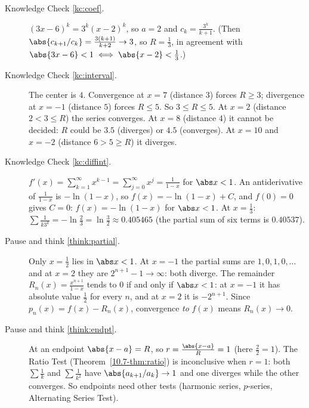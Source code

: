 \documentclass[11pt]{article}
\begin{document}
\begin{description}
  \item[Knowledge Check \ref{kc:coef}.] $(3x-6)^k=3^k(x-2)^k$, so $a=2$ and $c_k=\frac{3^k}{k+1}$. (Then $\abs{c_{k+1}/c_k}=\frac{3(k+1)}{k+2}\to3$, so $R=\frac13$, in agreement with $\abs{3x-6}<1\iff\abs{x-2}<\frac13$.)
  \item[Knowledge Check \ref{kc:interval}.] The center is $4$. Convergence at $x=7$ (distance $3$) forces $R\ge3$; divergence at $x=-1$ (distance $5$) forces $R\le5$. So $3\le R\le5$. At $x=2$ (distance $2<3\le R$) the series converges. At $x=8$ (distance $4$) it cannot be decided: $R$ could be $3.5$ (diverges) or $4.5$ (converges). At $x=10$ and $x=-2$ (distance $6>5\ge R$) it diverges.
  \item[Knowledge Check \ref{kc:diffint}.] $f'(x)=\sum_{k=1}^\infty x^{k-1}=\sum_{j=0}^\infty x^j=\frac1{1-x}$ for $\abs x<1$. An antiderivative of $\frac1{1-x}$ is $-\ln(1-x)$, so $f(x)=-\ln(1-x)+C$, and $f(0)=0$ gives $C=0$: $f(x)=-\ln(1-x)$ for $\abs x<1$. At $x=\frac13$: $\sum\frac1{k3^k}=-\ln\frac23=\ln\frac32\approx0.405465$ (the partial sum of six terms is $0.40537$).
  \item[Pause and think \ref{think:partial}.] Only $x=\frac12$ lies in $\abs x<1$. At $x=-1$ the partial sums are $1,0,1,0,\dots$ and at $x=2$ they are $2^{n+1}-1\to\infty$: both diverge. The remainder $R_n(x)=\frac{x^{n+1}}{1-x}$ tends to $0$ if and only if $\abs x<1$: at $x=-1$ it has absolute value $\frac12$ for every $n$, and at $x=2$ it is $-2^{n+1}$. Since $p_n(x)=f(x)-R_n(x)$, convergence \emph{to} $f(x)$ means $R_n(x)\to0$.
  \item[Pause and think \ref{think:endpt}.] At an endpoint $\abs{x-a}=R$, so $r=\frac{\abs{x-a}}R=1$ (here $\frac22=1$). The Ratio Test (Theorem~\ref{10.7-thm:ratio}) is inconclusive when $r=1$: both $\sum\frac1k$ and $\sum\frac1{k^2}$ have $\abs{a_{k+1}/a_k}\to1$ and one diverges while the other converges. So endpoints need other tests (harmonic series, $p$-series, Alternating Series Test).

\end{description}
\end{document}
